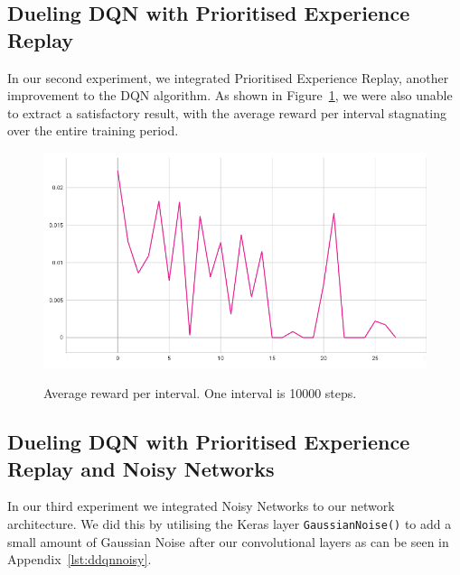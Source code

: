 \documentclass[12pt,a4paper]{article}
\begin{document}
    \subsection{Dueling DQN with Prioritised Experience Replay}\label{subsec:dueling-dqn-with-prioritised-experience-replay}
    In our second experiment, we integrated Prioritised Experience Replay, another improvement to the DQN algorithm.
    As shown in Figure~\ref{fig:ddqn_per_interval_score}, we were also unable to extract a satisfactory result, with the average reward per interval stagnating over the entire training period.

    \begin{figure}[H]
        \caption[DDQN/PER: Average reward per interval.]{Average reward per interval. One interval is 10000 steps.}
        \centering
        \includegraphics[scale=0.5]{interval_score_ddqn_per}
        \label{fig:ddqn_per_interval_score}
    \end{figure}

    \subsection{Dueling DQN with Prioritised Experience Replay and Noisy Networks}\label{subsec:dueling-dqn-with-prioritised-experience-replay-and-noisy-networks}
    In our third experiment we integrated Noisy Networks to our network architecture.
    We did this by utilising the Keras layer \texttt{GaussianNoise()} to add a small amount of Gaussian Noise after our convolutional layers as can be seen in Appendix~\ref{lst:ddqnnoisy}.
\end{document}
